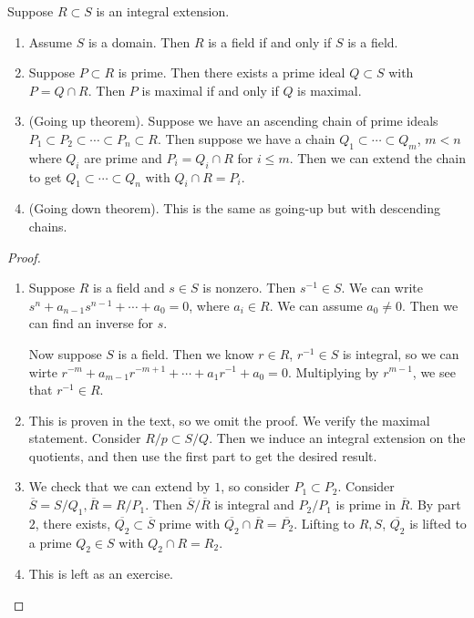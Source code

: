 \documentclass[10pt, twoside]{article}
\begin{document}
        \begin{thm}
            Suppose $R \subset S$ is an integral extension.
            \begin{enumerate}
                \item Assume $S$ is a domain. Then $R$ is a field if and only if $S$ is a field.
                \item Suppose $P \subset R$ is prime. Then there exists a prime ideal $Q \subset S$ with $P = Q \cap R$. Then $P$ is maximal if and only if $Q$ is maximal.
                \item (Going up theorem). Suppose we have an ascending chain of prime ideals $P_1 \subset P_2 \subset \cdots \subset P_n \subset R$. Then suppose we have a chain $Q_1 \subset \cdots \subset Q_m$, $m < n$ where $Q_i$ are prime and $P_i = Q_i \cap R$ for $i \leq m$. Then we can extend the chain to get $Q_1 \subset \cdots \subset Q_n$ with $Q_i \cap R = P_i$.
                \item (Going down theorem). This is the same as going-up but with descending chains.
            \end{enumerate}
            \begin{proof}
                \begin{enumerate}
                    \item Suppose $R$ is a field and $s \in S$ is nonzero. Then $s^{-1} \in S$. We can write $s^n + a_{n-1}s^{n-1} + \cdots + a_0 = 0$, where $a_i \in R$. We can assume $a_0 \neq 0$. Then we can find an inverse for $s$.

                          Now suppose $S$ is a field. Then we know $r \in R$, $r^{-1} \in S$ is integral, so we can wirte $r^{-m} + a_{m-1}r^{-m+1} + \cdots + a_1r^{-1}+a_0 = 0$. Multiplying by $r^{m-1}$, we see that $r^{-1} \in R$.
                    \item This is proven in the text, so we omit the proof. We verify the maximal statement. Consider $R/p \subset S/Q$. Then we induce an integral extension on the quotients, and then use the first part to get the desired result.
                    \item We check that we can extend by $1$, so consider $P_1 \subset P_2$. Consider $\overline{S} = S/Q_1, \overline{R} = R/P_1$. Then $\overline{S}/\overline{R}$ is integral and $P_2/P_1$ is prime in $\overline{R}$. By part $2$, there exists, $\overline{Q_2} \subset \overline{S}$ prime with $\overline{Q_2} \cap \overline{R} = \overline{P_2}$. Lifting to $R,S$, $\overline{Q_2}$ is lifted to a prime $Q_2 \in S$ with $Q_2 \cap R = R_2$.
                    \item This is left as an exercise.
                \end{enumerate}
            \end{proof}
        \end{thm}
\end{document}
